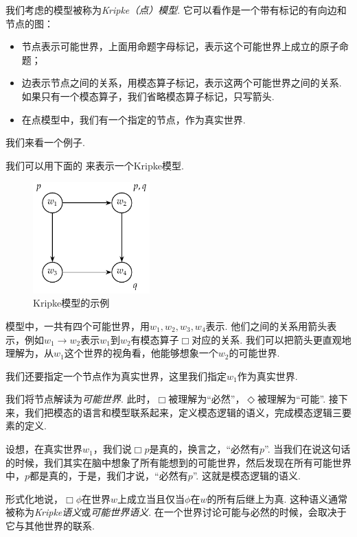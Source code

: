 我们考虑的模型被称为\textit{Kripke（点）模型}. 它可以看作是一个带有标记的有向边和节点的图：
\begin{itemize}
\item 节点表示可能世界，上面用命题字母标记，表示这个可能世界上成立的原子命题；
\item 边表示节点之间的关系，用模态算子标记，表示这两个可能世界之间的关系. 如果只有一个模态算子，我们省略模态算子标记，只写箭头. 
\item 在点模型中，我们有一个指定的节点，作为真实世界. 
\end{itemize}

我们来看一个例子. 

\begin{example}
我们可以用下面的 来表示一个Kripke模型. 

\begin{figure}[ht]
\centering
\includegraphics[width=0.4\textwidth]{figures/modal-logic/Kripke-model-basic.pdf}
\caption{Kripke模型的示例}\label{fig:kripke-model-basic}
\end{figure}

模型中，一共有四个可能世界，用$w_1,w_2,w_3,w_4$表示. 他们之间的关系用箭头表示，例如$w_1\to w_2$表示$w_1$到$w_2$有模态算子$\Box$对应的关系. 我们可以把箭头更直观地理解为，从$w_1$这个世界的视角看，他能够想象一个$w_2$的可能世界. 

我们还要指定一个节点作为真实世界，这里我们指定$w_1$作为真实世界. 
\end{example}

我们将节点解读为\textit{可能世界}. 此时，$\Box$被理解为“必然”，$\Diamond$被理解为“可能”. 接下来，我们把模态的语言和模型联系起来，定义模态逻辑的语义，完成模态逻辑三要素的定义. 

设想，在真实世界$w_1$，我们说$\Box p$是真的，换言之，“必然有$p$”. 当我们在说这句话的时候，我们其实在脑中想象了所有能想到的可能世界，然后发现在所有可能世界中，$p$都是真的，于是，我们才说，“必然有$p$”. 这就是模态逻辑的语义. 

形式化地说，$\Box\phi$在世界$w$上成立当且仅当$\phi$在$w$的所有后继上为真. 这种语义通常被称为\textit{Kripke语义}或\textit{可能世界语义}. 在一个世界讨论可能与必然的时候，会取决于它与其他世界的联系. 

